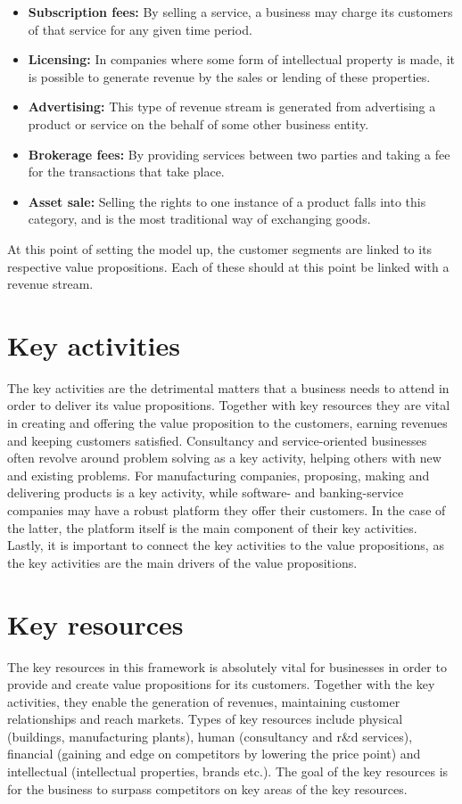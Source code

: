 \begin{itemize}
    \item \textbf{Subscription fees: }By selling a service, a business may charge its customers of that service for any given time period. 
    \item \textbf{Licensing: }In companies where some form of intellectual property is made, it is possible to generate revenue by the sales or lending of these properties.
    \item \textbf{Advertising: }This type of revenue stream is generated from advertising a product or service on the behalf of some other business entity.
    \item \textbf{Brokerage fees: }By providing services between two parties and taking a fee for the transactions that take place.
    \item \textbf{Asset sale: }Selling the rights to one instance of a product falls into this category, and is the most traditional way of exchanging goods.
\end{itemize}

At this point of setting the model up, the customer segments are linked to its respective value propositions. Each of these should at this point be linked with a revenue stream.

\section{Key activities}
The key activities are the detrimental matters that a business needs to attend in order to deliver its value propositions. Together with key resources they are vital in creating and offering the value proposition to the customers, earning revenues and keeping customers satisfied. Consultancy and service-oriented businesses often revolve around problem solving as a key activity, helping others with new and existing problems. For manufacturing companies, proposing, making and delivering products is a key activity, while software- and banking-service companies may have a robust platform they offer their customers. In the case of the latter, the platform itself is the main component of their key activities. Lastly, it is important to connect the key activities to the value propositions, as the key activities are the main drivers of the value propositions.

\section{Key resources}
The key resources in this framework is absolutely vital for businesses in order to provide and create value propositions for its customers. Together with the key activities, they enable the generation of revenues, maintaining customer relationships and reach markets. Types of key resources include physical (buildings, manufacturing plants), human (consultancy and r\&d services), financial (gaining and edge on competitors by lowering the price point) and intellectual (intellectual properties, brands etc.). The goal 
of the key resources is for the business to surpass competitors on key areas of the key resources.

